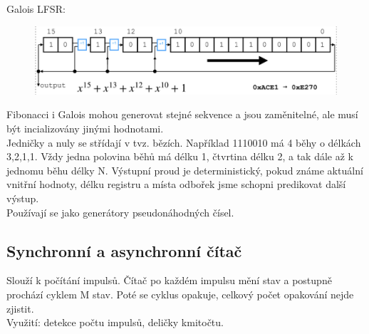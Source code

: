 Galois LFSR: \\
\begin{figure}[h!]
    \centering
    \includegraphics*[scale = 0.4]{img/Galois.png}
\end{figure}

Fibonacci i Galois mohou generovat stejné sekvence a jsou zaměnitelné, ale musí být incializovány jinými hodnotami.\\
Jedničky a nuly se střídají v tvz. bězích. Například 1110010 má 4 běhy o délkách 3,2,1,1. Vždy jedna polovina běhů má délku 1, čtvrtina délku 2, a tak dále až k jednomu běhu délky N.
Výstupní proud je deterministický, pokud známe aktuální vnitřní hodnoty, délku registru a místa odbořek jsme schopni predikovat další výstup.\\
Používají se jako generátory pseudonáhodných čísel.

\subsection{Synchronní a asynchronní čítač}
Slouží k počítání impulsů. Čítač po každém impulsu mění stav a postupně prochází cyklem M stav. Poté se cyklus opakuje, celkový počet opakování nejde zjistit.\\
Využití: detekce počtu impulsů, deličky kmitočtu.\\

